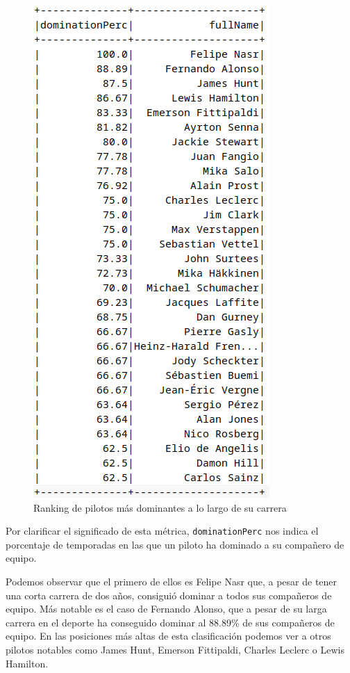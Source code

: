 \documentclass[12pt,twoside,titlepage]{report}
\begin{document}
\begin{figure}[H]
	\includegraphics[scale=0.3]{results/bestdrivers/driverdomperc.png}
	\centering
	\caption{Ranking de pilotos más dominantes a lo largo de su carrera}
	\label{fig:dominationPerc}
	\centering
\end{figure}

Por clarificar el significado de esta métrica, \texttt{dominationPerc} nos indica el porcentaje de temporadas en las que un piloto ha dominado a su compañero de equipo.

Podemos observar que el primero de ellos es Felipe Nasr que, a pesar de tener una corta carrera de dos años, consiguió dominar a todos sus compañeros de equipo. Más notable es el caso de Fernando Alonso, que a pesar de su larga carrera en el deporte ha conseguido dominar al 88.89\% de sus compañeros de equipo. En las posiciones más altas de esta clasificación podemos ver a otros pilotos notables como James Hunt, Emerson Fittipaldi, Charles Leclerc o Lewis Hamilton.
\end{document}
